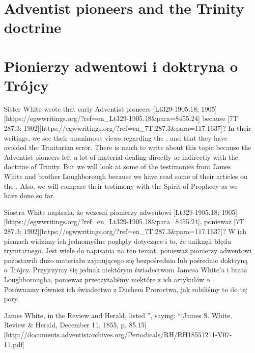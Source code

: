 \chapter{Adventist pioneers and the Trinity doctrine}


\chapter{Pionierzy adwentowi i doktryna o Trójcy}


Sister White wrote that early Adventist pioneers [Lt329-1905.18; 1905][https://egwwritings.org/?ref=en\_Lt329-1905.18&para=8455.24] because [7T 287.3; 1902][https://egwwritings.org/?ref=en\_7T.287.3&para=117.1637]? In their writings, we see their unanimous views regarding the , and that they have avoided the Trinitarian error. There is much to write about this topic because the Adventist pioneers left a lot of material dealing directly or indirectly with the doctrine of Trinity. But we will look at some of the testimonies from James White and brother Loughborough because we have read some of their articles on the . Also, we will compare their testimony with the Spirit of Prophecy as we have done so far.


Siostra White napisała, że wczesni pionierzy adwentowi [Lt329-1905.18; 1905][https://egwwritings.org/?ref=en\_Lt329-1905.18&para=8455.24], ponieważ [7T 287.3; 1902][https://egwwritings.org/?ref=en\_7T.287.3&para=117.1637]? W ich pismach widzimy ich jednomyślne poglądy dotyczące  i to, że uniknęli błędu trynitarnego. Jest wiele do napisania na ten temat, ponieważ pionierzy adwentowi pozostawili dużo materiału zajmującego się bezpośrednio lub pośrednio doktryną o Trójcy. Przyjrzymy się jednak niektórym świadectwom Jamesa White'a i brata Loughborougha, ponieważ przeczytaliśmy niektóre z ich artykułów o . Porównamy również ich świadectwo z Duchem Proroctwa, jak robiliśmy to do tej pory.


James White, in the Review and Herald, listed ”, saying: “[James S. White, Review \& Herald, December 11, 1855, p. 85.15][http://documents.adventistarchives.org/Periodicals/RH/RH18551211-V07-11.pdf]


